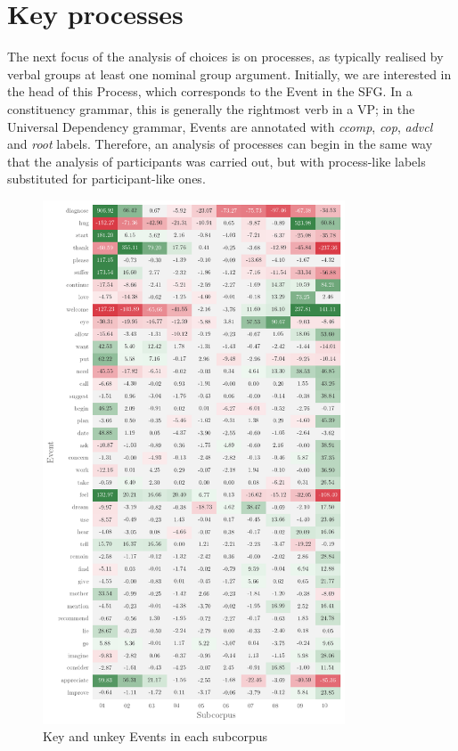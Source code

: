 
\section{Key processes} 

The next focus of the analysis of  choices is on processes, as typically realised by verbal groups at least one nominal group argument. Initially, we are interested in the head of this Process, which corresponds to the Event in the \gls{SFG}. In a constituency grammar, this is generally the rightmost verb in a VP; in the Universal Dependency grammar, Events are annotated with \emph{ccomp}, \emph{cop}, \emph{advcl} and \emph{root} labels. Therefore, an analysis of processes can begin in the same way that the analysis of participants was carried out, but with process\hyp{}like labels substituted for participant\hyp{}like ones.

\begin{figure}
    \includegraphics[width=0.80\textwidth]{../images/event-heatmap.png}
    \hspace{1.6cm}
    \caption{Key and unkey Events in each subcorpus}
    \label{fig:event_heatmap}
    \end{figure}

